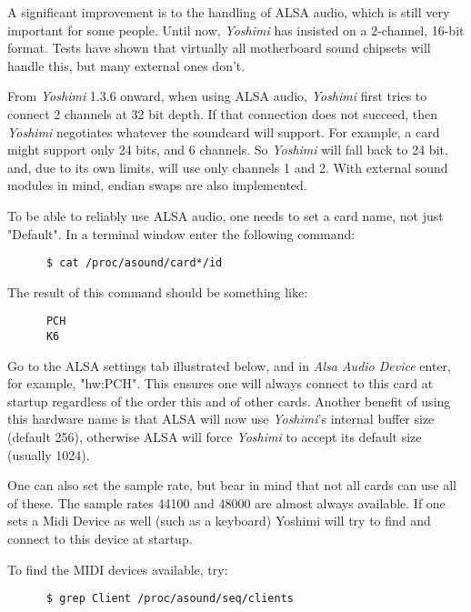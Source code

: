    A significant improvement is to the handling of ALSA audio, which is still
   very important for some people. Until now, \textsl{Yoshimi} has insisted
   on a 2-channel, 16-bit format. Tests have shown that virtually all
   motherboard sound chipsets will handle this, but many external ones don't.

   From \textsl{Yoshimi} 1.3.6 onward, when using ALSA audio,
   \textsl{Yoshimi} first tries to connect 2 channels at 32 bit depth.  If
   that connection does not succeed, then \textsl{Yoshimi} negotiates
   whatever the soundcard will support.  For example, a card might support
   only 24 bits, and 6 channels.  So \textsl{Yoshimi} will fall back to
   24 bit, and, due to its own limits, will use only channels 1 and 2.
   With external sound modules in mind, endian swaps are also implemented.

   To be able to reliably use ALSA audio, one needs to set a card name, not just
   "Default".  In a terminal window enter the following command:

   \begin{verbatim}
      $ cat /proc/asound/card*/id
   \end{verbatim}

   The result of this command should be something like:

   \begin{verbatim}
      PCH
      K6
   \end{verbatim}

   Go to the ALSA settings tab illustrated below, and in
   \textsl{Alsa Audio Device} enter, for example, "hw:PCH".
   This ensures one will always connect to this card at startup regardless of
   the order this and of other cards.  Another benefit of using this hardware name
   is that ALSA will now use \textsl{Yoshimi}'s internal
   buffer size (default 256), otherwise ALSA will force \textsl{Yoshimi} to accept its
   default size (usually 1024).

   One can also set the sample rate, but bear in mind that not all cards can use
   all of these.  The sample rates 44100 and 48000 are almost always available.
   If one sets a Midi Device as well (such as a keyboard) Yoshimi will try to
   find and connect to this device at startup.

   To find the MIDI devices available, try:

   \begin{verbatim}
      $ grep Client /proc/asound/seq/clients
   \end{verbatim}

